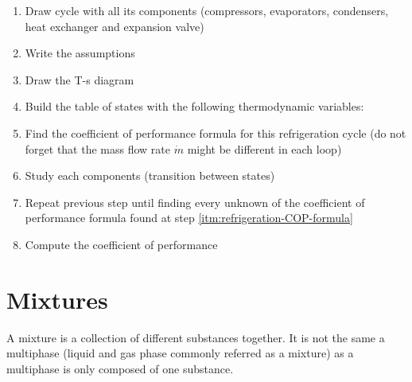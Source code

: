 \documentclass[10pt, twocolumn]{article}
\begin{document}
\begin{enumerate}
  \item Draw cycle with all its components (compressors, evaporators, condensers, heat exchanger and expansion valve)
  \item Write the assumptions
  \item Draw the T-s diagram
  \item Build the table of states with the following thermodynamic variables:
  \item \label{itm:refrigeration-COP-formula} Find the coefficient of performance formula for this refrigeration cycle (do not forget that the mass flow rate \(\dot{m}\) might be different in each loop)
  \item Study each components (transition between states)
  \item Repeat previous step until finding every unknown of the coefficient of performance formula found at step \ref{itm:refrigeration-COP-formula}
  \item Compute the coefficient of performance
\end{enumerate}


\section{Mixtures}
A mixture is a collection of different substances together.
It is not the same a multiphase (liquid and gas phase commonly referred as a mixture) as a multiphase is only composed of one substance.
\end{document}
